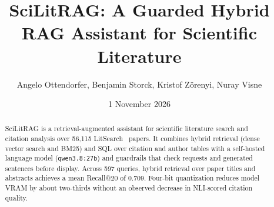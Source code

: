 \documentclass[11pt,a4paper]{article}
\title{SciLitRAG: A Guarded Hybrid RAG Assistant for Scientific Literature}
\author{Angelo Ottendorfer, Benjamin Storck, Kristof Zörenyi, Nuray Visne}
\date{1 November 2026}
\begin{document}
\maketitle

\begin{abstract}
SciLitRAG is a retrieval-augmented assistant for scientific literature search and citation analysis over 56{,}115 LitSearch~\cite{ajith2024litsearch} papers.
It combines hybrid retrieval (dense vector search and BM25) and SQL over citation and author tables with a self-hosted language model (\texttt{qwen3.8:27b}) and guardrails that check requests and generated sentences before display.
Across 597 queries, hybrid retrieval over paper titles and abstracts achieves a mean Recall@20 of 0.709.
Four-bit quantization reduces model VRAM by about two-thirds without an observed decrease in NLI-scored citation quality.
\end{abstract}











\appendix

\end{document}
